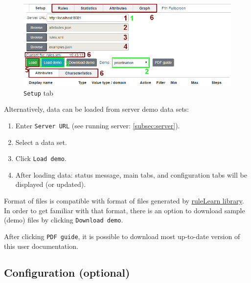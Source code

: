 \documentclass[12pt]{article}
\begin{document}
\begin{figure}[H]
    \centering
    \includegraphics[width=\textwidth]{figures/setup.png}
    \caption{\texttt{Setup} tab}\label{fig:setup}
\end{figure}

Alternatively, data can be loaded from server demo data sets:
\begin{enumerate}
    \setlength\itemsep{0em}
    \item Enter \texttt{Server URL} (see running server: \ref{subsec:server}).
    \item Select a data set.
    \item Click \texttt{Load demo}.
    \item After loading data: status message, main tabs, and configuration tabs will be displayed (or updated).
\end{enumerate}

Format of files is compatible with format of files generated by \href{https://github.com/ruleLearn/rulelearn}{ruleLearn library}. In order to get familiar with that format, there is an option to download sample (demo) files by clicking \texttt{Download demo}.

After clicking \texttt{PDF guide}, it is possible to download most up-to-date version of this user documentation.

\subsection{Configuration (optional)}
\end{document}
